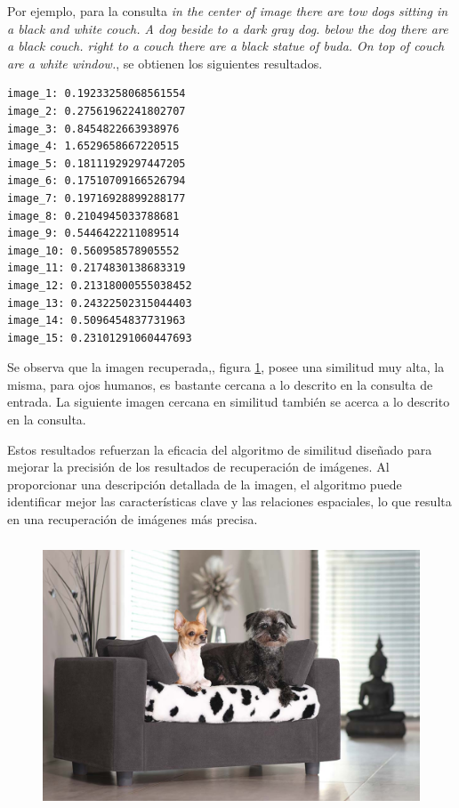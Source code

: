 Por ejemplo, para la consulta \textit{in the center of image there are tow dogs sitting in a black and white couch. A dog beside to a dark gray dog.  below the dog there are a black couch. right to a couch there are a black statue of buda. On top of couch are a white window.}, se obtienen los siguientes resultados.
\begin{verbatim}
image_1: 0.19233258068561554
image_2: 0.27561962241802707
image_3: 0.8454822663938976
image_4: 1.6529658667220515
image_5: 0.18111929297447205
image_6: 0.17510709166526794
image_7: 0.19716928899288177
image_8: 0.2104945033788681
image_9: 0.5446422211089514
image_10: 0.560958578905552
image_11: 0.2174830138683319
image_12: 0.21318000555038452
image_13: 0.24322502315044403
image_14: 0.5096454837731963
image_15: 0.23101291060447693
\end{verbatim}
Se observa que la imagen recuperada,, figura \ref{fig:dogs_couch}, posee una similitud muy alta, la misma, para ojos humanos, es bastante cercana a lo descrito en la consulta de entrada. La siguiente imagen cercana en similitud también se acerca a lo descrito en la consulta.

Estos resultados refuerzan la eficacia del algoritmo de similitud diseñado para mejorar la precisión de los resultados de recuperación de im\'agenes. Al proporcionar una descripción detallada de la imagen, el algoritmo puede identificar mejor las características clave y las relaciones espaciales, lo que resulta en una recuperación de im\'agenes m\'as precisa.

\begin{figure}[H]
\centering
 \includegraphics[height=80mm]{Graphics/Images/image_4.jpg}
 \caption{ }
 \label{fig:dogs_couch}
\end{figure}

